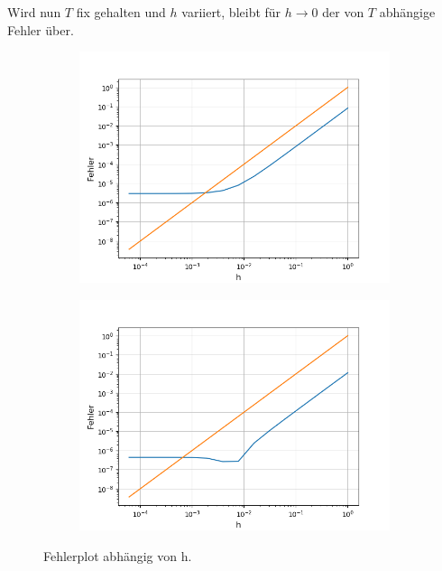 \documentclass[12pt,a4paper]{scrartcl}
\numberwithin{equation}{section}
\numberwithin{myalgctr}{section}
\numberwithin{mytheoremctr}{subsection}
\numberwithin{mykorollarctr}{subsection}
\numberwithin{mylemmactr}{subsection}
\numberwithin{mybeispielctr}{subsection}
\begin{document}
	
	Wird nun $T$ fix gehalten und $h$ variiert, bleibt f\"ur $h\to 0$ der von $T$ abh\"angige Fehler \"uber. 
	
	\begin{figure}[H]
		\begin{subfigure}[t]{0.5\textwidth}
			\includegraphics[width=\linewidth]{FehlerplotTsinx.png}
			 \label{fig:fehlerplottsinx}
		\end{subfigure}
		\begin{subfigure}[t]{0.5\textwidth}
			\includegraphics[width=\linewidth]{FehlerplotTexp.png}
			 \label{fig:fehlerplottexp}
		\end{subfigure}
		\caption{Fehlerplot abhängig von h.}
		\label{fig:fehlerplott}
	\end{figure}
	
\end{document}
